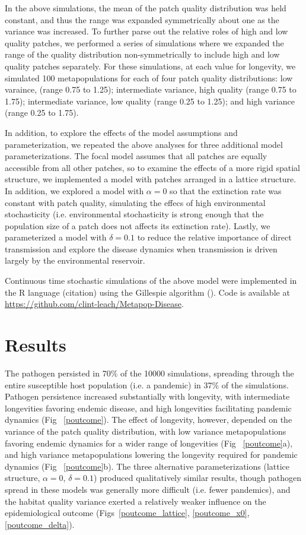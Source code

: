 \documentclass{svjour3}
\begin{document}
In the above simulations, the mean of the patch quality distribution was held constant, and thus the range was expanded symmetrically about one as the variance was increased.  To further parse out the relative roles of high and low quality patches, we performed a series of simulations where we expanded the range of the quality distribution non-symmetrically to include high and low quality patches separately.  For these simulations, at each value for longevity, we simulated 100 metapopulations for each of four patch quality distributions: low varaince, (range 0.75 to 1.25); intermediate variance, high quality (range 0.75 to 1.75); intermediate variance, low quality (range 0.25 to 1.25); and high variance (range 0.25 to 1.75).

In addition, to explore the effects of the model assumptions and parameterization, we repeated the above analyses for three additional model parameterizations.  The focal model assumes that all patches are equally accessible from all other patches, so to examine the effects of a more rigid spatial structure, we implemented a model with patches arranged in a lattice structure.  In addition, we explored a model with $\alpha = 0$ so that the extinction rate was constant with patch quality, simulating the effecs of high environmental stochasticity (i.e. environmental stochasticity is strong enough that the population size of a patch does not affects its extinction rate).  Lastly, we parameterized a model with $\delta = 0.1$ to reduce the relative importance of direct transmission and explore the disease dynamics when transmission is driven largely by the environmental reservoir. 

Continuous time stochastic simulations of the above model were implemented in the R language (citation) using the Gillespie algorithm (\cite{Gillespie1977}).  Code is available at \url{https://github.com/clint-leach/Metapop-Disease}.

\section{Results}
\label{results}

The pathogen persisted in 70$\%$ of the 10000 simulations, spreading through the entire susceptible host population (i.e. a pandemic) in 37$\%$ of the simulations.  Pathogen persistence increased substantially with longevity, with intermediate longevities favoring endemic disease, and high longevities facilitating pandemic dynamics (Fig~ \ref{poutcome}).  The effect of longevity, however, depended on the variance of the patch quality distribution, with low variance metapopulations favoring endemic dynamics for a wider range of longevities (Fig~ \ref{poutcome}a), and high variance metapopulations lowering the longevity required for pandemic dynamics (Fig~ \ref{poutcome}b).  The three alternative parameterizations (lattice structure, $\alpha = 0$, $\delta = 0.1$) produced qualitatively similar results, though pathogen spread in these models was generally more difficult (i.e. fewer pandemics), and the habitat quality variance exerted a relatively weaker influence on the epidemiological outcome (Figs~\ref{poutcome_lattice}, \ref{poutcome_x0}, \ref{poutcome_delta}).
\end{document}
